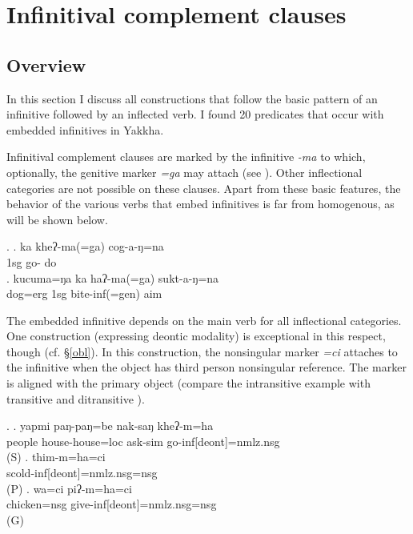 \section{Infinitival complement clauses}\label{nonfin-comp}
\subsection{Overview}

In this section I discuss all constructions that follow the basic pattern of an infinitive followed by an inflected verb. I found 20 predicates  that occur with embedded infinitives in Yakkha. 

Infinitival complement clauses are marked by the infinitive \emph{-ma} to which, optionally, the genitive marker \emph{=ga}  may attach (see \Next). Other inflectional categories are not possible on these clauses. Apart from these basic features, the behavior of the various verbs that  embed infinitives is far from homogenous, as will be shown below. 

 \ex. \ag. ka kheʔ-ma(=ga) cog-a-ŋ=na\\
		{\sc 1sg}  go- do\\
		\bg. kucuma=ŋa ka haʔ-ma(=ga) sukt-a-ŋ=na\\
		dog{\sc =erg} {\sc 1sg} bite{\sc -inf(=gen)} aim \\
	
	
The embedded infinitive depends on the main verb for all inflectional categories. One construction (expressing deontic modality) is exceptional in this respect, though (cf. §\ref{obl}). In this construction, the nonsingular marker \emph{=ci}  attaches to the infinitive when the object has third person nonsingular reference. The marker is aligned with the primary object (compare the intransitive example \Next[a] with transitive  \Next[b] and ditransitive \Next[c]).  
			
\ex. \ag. yapmi  paŋ-paŋ=be nak-saŋ kheʔ-m=ha\\
		people house-house{\sc =loc} ask-{\sc sim} go-{\sc inf[deont]=nmlz.nsg}\\
	  (S) 
\bg. thim-m=ha=ci\\
scold-{\sc inf[deont]=nmlz.nsg=nsg}\\
 (P)
 \bg. wa=ci piʔ-m=ha=ci\\
chicken{\sc =nsg} give-{\sc inf[deont]=nmlz.nsg=nsg}\\
 (G)




